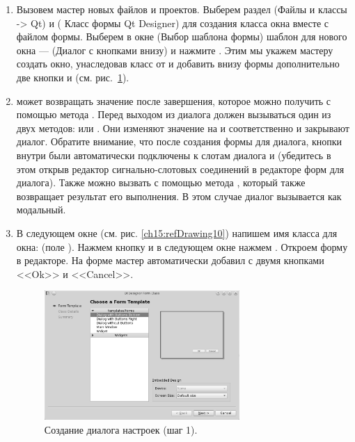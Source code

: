 \begin{enumerate}
\item Вызовем мастер новых файлов и проектов. Выберем раздел 
(Файлы и классы -> Qt) и  (
Класс формы Qt Designer) для создания класса окна вместе с файлом формы. Выберем в окне
 (Выбор шаблона формы) шаблон для нового окна ---
 (Диалог с кнопками внизу) и нажмите
. Этим мы укажем мастеру создать окно, унаследовав класс от  и
добавить внизу формы дополнительно две кнопки  и  (см. рис.~\ref{ch15:refDrawing9}). 
\item {} может возвращать значение после завершения, которое можно получить с помощью метода
. Перед выходом из диалога должен вызываться один из двух методов:
 или . Они изменяют значение
 на  и 
соответственно и закрывают диалог. Обратите внимание, что после создания формы для диалога, кнопки внутри
 были автоматически подключены к слотам диалога  и
 (убедитесь в этом открыв редактор сигнально-слотовых соединений в редакторе форм для диалога).
Также  можно вызвать с помощью метода , который также
возвращает результат его выполнения. В этом случае диалог вызывается как модальный. 

\item В следующем окне (см. рис. \ref{ch15:refDrawing10}) напишем имя класса для окна: 
(поле ). Нажмем кнопку  и в следующем окне нажмем
. Откроем форму в редакторе. На форме мастер автоматически добавил  с
двумя кнопками <<Ok>> и <<Cancel>>.

\begin{figure}[htb]
\begin{center}
\includegraphics[width=0.7\textwidth]{img/ris_15_10}
\caption[Создание диалога настроек (шаг 1).]{Создание диалога настроек (шаг 1).}
\label{ch15:refDrawing9}
\end{center}
\end{figure}


\end{enumerate}
